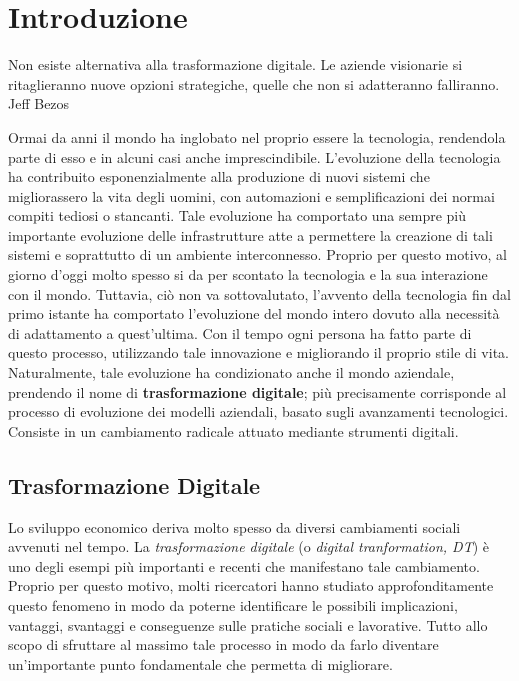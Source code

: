 \chapter{Introduzione}
\label{ch:Introduzione}

\begin{citazione}
Non esiste alternativa alla trasformazione digitale. Le aziende visionarie si ritaglieranno nuove opzioni strategiche, quelle che non si adatteranno falliranno. Jeff Bezos\cite{jeff_bezos_cite}
\end{citazione}

Ormai da anni il mondo ha inglobato nel proprio essere la tecnologia, rendendola parte di esso e in alcuni casi anche imprescindibile. L’evoluzione della tecnologia ha contribuito esponenzialmente alla produzione di nuovi sistemi che migliorassero la vita degli uomini, con automazioni e semplificazioni dei normai compiti tediosi o stancanti. Tale evoluzione ha comportato una sempre più importante evoluzione delle infrastrutture atte a permettere la creazione di tali sistemi e soprattutto di un ambiente interconnesso. Proprio per questo motivo, al giorno d'oggi molto spesso si da per scontato la tecnologia e la sua interazione con il mondo. Tuttavia, ciò non va sottovalutato, l'avvento della tecnologia fin dal primo istante ha comportato l'evoluzione del mondo intero dovuto alla necessità di adattamento a quest'ultima. Con il tempo ogni persona ha fatto parte di questo processo, utilizzando tale innovazione e migliorando il proprio stile di vita. Naturalmente, tale evoluzione ha condizionato anche il mondo aziendale, prendendo il nome di \textbf{trasformazione digitale}; più precisamente corrisponde al processo di evoluzione dei modelli aziendali, basato sugli avanzamenti tecnologici. Consiste in un cambiamento radicale attuato mediante strumenti digitali.~\cite{redhat_digital_transformation}

\section{Trasformazione Digitale}
Lo sviluppo economico deriva molto spesso da diversi cambiamenti sociali avvenuti nel tempo. La \textit{trasformazione digitale} (o \textit{digital tranformation, DT}) è uno degli esempi più importanti e recenti che manifestano tale cambiamento. Proprio per questo motivo, molti ricercatori hanno studiato approfonditamente questo fenomeno in modo da poterne identificare le possibili implicazioni, vantaggi, svantaggi e conseguenze sulle pratiche sociali e lavorative. Tutto allo scopo di sfruttare al massimo tale processo in modo da farlo diventare un'importante punto fondamentale che permetta di migliorare.~\cite{sciencedirect_digital_transformation}

